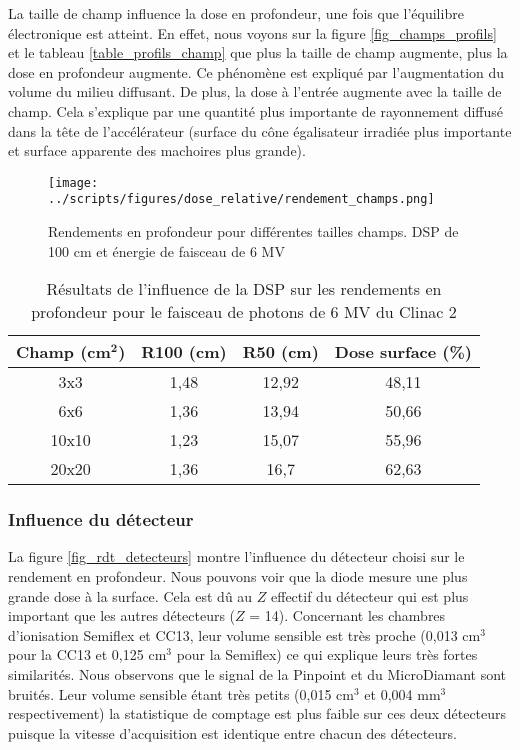 \documentclass{article}
\begin{document}
La taille de champ influence la dose en profondeur, une fois que l'équilibre électronique est atteint. En effet, nous voyons sur la figure \ref*{fig_champs_profils} et le tableau \ref*{table_profils_champ} que plus la taille de champ augmente, plus la dose en profondeur augmente. Ce phénomène est expliqué par l'augmentation du volume du milieu diffusant. De plus, la dose à l'entrée augmente avec la taille de champ. Cela s'explique par une quantité plus importante de rayonnement diffusé dans la tête de l'accélérateur (surface du cône égalisateur irradiée plus importante et surface apparente des machoires plus grande).

\begin{figure}[h!]
  \centering
  \texttt{[image: ../scripts/figures/dose\_relative/rendement\_champs.png]}
  \caption{Rendements en profondeur pour différentes tailles champs. DSP de 100 cm et énergie de faisceau de 6 MV}
  \label{fig_rdt_champ}
\end{figure}

\begin{table}[h]
  \centering
  \begin{tabular}{cccc}
    \toprule
    \textbf{Champ (cm}$\mathbf{^2}$\textbf{)} & \textbf{R100 (cm)} & \textbf{R50 (cm)} & \textbf{Dose surface (\%)} \\
    \toprule
    3x3 & 1,48 & 12,92 & 48,11 \\
    6x6 & 1,36 & 13,94 &  50,66 \\
    10x10 & 1,23 & 15,07 & 55,96 \\
    20x20 & 1,36 & 16,7 & 62,63 \\
    \bottomrule
  \end{tabular}
  \caption{Résultats de l'influence de la DSP sur les rendements en profondeur pour le faisceau de photons de 6 MV du Clinac 2}
  \label{table_rdt_dsp}
\end{table}

\newpage
\subsubsection{Influence du détecteur}

La figure \ref*{fig_rdt_detecteurs} montre l'influence du détecteur choisi sur le rendement en profondeur. Nous pouvons voir que la diode mesure une plus grande dose à la surface. Cela est dû au $Z$ effectif du détecteur qui est plus important que les autres détecteurs ($Z$ = 14). Concernant les chambres d'ionisation Semiflex et CC13, leur volume sensible est très proche (0,013 cm$^3$ pour la CC13 et 0,125 cm$^3$ pour la Semiflex) ce qui explique leurs très fortes similarités. Nous observons que le signal de la Pinpoint et du MicroDiamant sont bruités. Leur volume sensible étant très petits (0,015 cm$^3$ et 0,004 mm$^3$ respectivement) la statistique de comptage est plus faible sur ces deux détecteurs puisque la vitesse d'acquisition est identique entre chacun des détecteurs.
\end{document}
